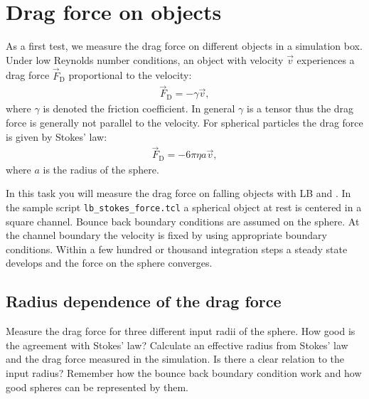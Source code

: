 \section{Drag force on objects}
As a first test, we measure the drag force on different objects in a simulation
box. Under low Reynolds number conditions, an object with velocity $\vec{v}$
experiences a drag force $\vec{F}_\text{D}$ proportional to the velocity:
\begin{align*}
	\vec{F}_\text{D}=-\gamma\vec{v},
\end{align*}
where $\gamma$ is denoted the friction coefficient. In general $\gamma$ is a
tensor thus the drag force is generally not parallel to the velocity. For
spherical particles the drag force is given by Stokes' law:
\begin{align*}
	\vec{F}_\text{D}=-6\pi\eta a\vec{v},
\end{align*}
where $a$ is the radius of the sphere.

In this task you will measure the drag force on falling objects with LB and
\ES{}. In the sample script \texttt{lb\_stokes\_force.tcl} a spherical object at rest
is centered in a square channel. Bounce back boundary conditions are assumed on
the sphere. At the channel boundary the velocity is fixed by using appropriate
boundary conditions. Within a few hundred or thousand  integration steps a
steady state develops and the force on the sphere converges.

\subsection*{Radius dependence of the drag force}
Measure the drag force for three different input radii of the sphere. How good
is the agreement with Stokes' law? Calculate an effective radius from Stokes'
law and the drag force measured in the simulation. Is there a clear relation to
the input radius? Remember how the bounce back boundary condition work and how
good spheres can be represented by them.

